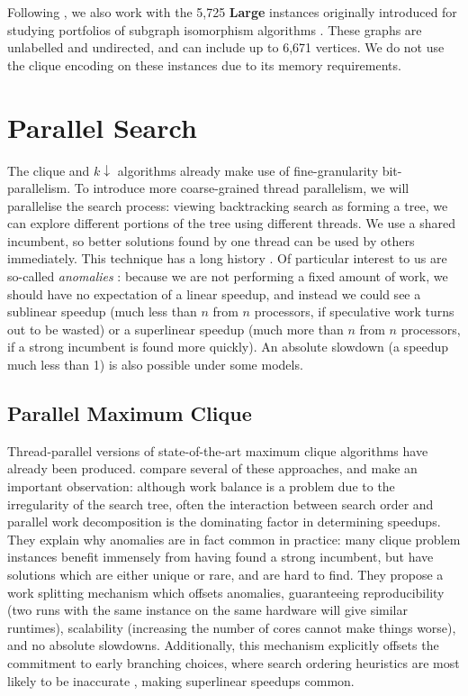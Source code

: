 \documentclass[sigconf]{acmart}
\begin{document}
\noindent
Following \citet{DBLP:conf/aaai/HoffmannMR17}, we also work with the 5,725 \textbf{Large} instances
originally introduced for studying portfolios of subgraph isomorphism algorithms
\citep{DBLP:conf/lion/KotthoffMS16}. These graphs are unlabelled and undirected, and can include up
to 6,671 vertices. We do not use the clique encoding on these instances due to its
memory requirements.

\section{Parallel Search}

The clique and $k{\downarrow}$ algorithms already make use of fine-granularity bit-parallelism. To
introduce more coarse-grained thread parallelism, we will parallelise the search process: viewing
backtracking search as forming a tree, we can explore different portions of the tree using different
threads. We use a shared incumbent, so better solutions found by one thread can be used by others
immediately. This technique has a long history \citep{o:BaderHC05}. Of particular
interest to us are so-called \emph{anomalies}
\citep{DBLP:journals/cacm/LaiS84,DBLP:journals/tc/LiW86,DBLP:conf/irregular/BruinKT95}:
because we are not performing a fixed amount of work, we should have no expectation of a linear
speedup, and instead we could see a sublinear speedup (much less than $n$ from $n$ processors, if
speculative work turns out to be wasted) or a superlinear speedup (much more than $n$ from $n$
processors, if a strong incumbent is found more quickly). An absolute slowdown (a speedup much less
than 1) is also possible under some models.

\subsection{Parallel Maximum Clique}

Thread-parallel versions of state-of-the-art maximum clique algorithms have already been produced.
\citet{DBLP:journals/topc/McCreeshP15} compare several of these approaches, and make an important
observation: although work balance is a problem due to the irregularity of the search tree, often
the interaction between search order and parallel work decomposition is the dominating factor in
determining speedups. They explain why anomalies are in fact common in practice: many clique problem
instances benefit immensely from having found a strong incumbent, but have solutions which are
either unique or rare, and are hard to find. They propose a work splitting mechanism which offsets
anomalies, guaranteeing reproducibility (two runs with the same instance on the same hardware will
give similar runtimes), scalability (increasing the number of cores cannot make things worse), and
no absolute slowdowns.  Additionally, this mechanism explicitly offsets the commitment to early
branching choices, where search ordering heuristics are most likely to be inaccurate
\citep{DBLP:conf/ijcai/HarveyG95,DBLP:conf/cp/ChuSS09}, making superlinear speedups
common.
\end{document}
